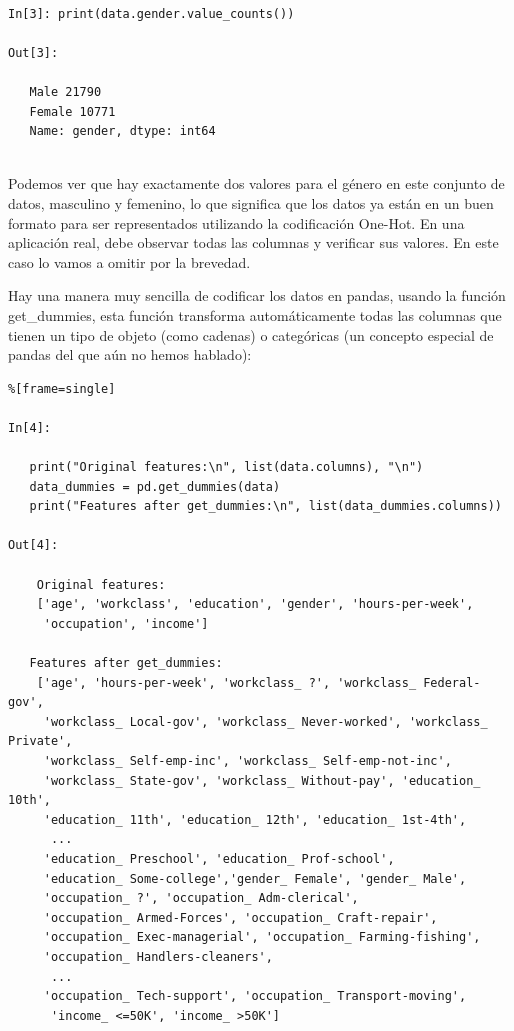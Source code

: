 \begin{lstlisting}  

In[3]: print(data.gender.value_counts())

Out[3]:

   Male 21790
   Female 10771
   Name: gender, dtype: int64
  
\end{lstlisting} 

Podemos ver que hay exactamente dos valores para el género en este conjunto de datos, masculino y femenino, lo que significa que los datos ya están en un buen formato para ser representados utilizando la codificación One-Hot.  En una aplicación real, debe observar todas las columnas y verificar sus valores. En este caso lo vamos a omitir  por la brevedad.

 Hay una manera muy sencilla de codificar los datos en  {\ttfamily pandas}, usando la función {\ttfamily get\_dummies}, esta función  transforma automáticamente todas las columnas que tienen un tipo de objeto (como cadenas) o  categóricas (un concepto especial de {\ttfamily pandas} del que aún no hemos hablado):\\


\begin{lstlisting}%[frame=single]

In[4]:

   print("Original features:\n", list(data.columns), "\n")
   data_dummies = pd.get_dummies(data)
   print("Features after get_dummies:\n", list(data_dummies.columns))

Out[4]:

    Original features:
    ['age', 'workclass', 'education', 'gender', 'hours-per-week',
     'occupation', 'income']

   Features after get_dummies:
    ['age', 'hours-per-week', 'workclass_ ?', 'workclass_ Federal-gov',
     'workclass_ Local-gov', 'workclass_ Never-worked', 'workclass_ Private',
     'workclass_ Self-emp-inc', 'workclass_ Self-emp-not-inc',
     'workclass_ State-gov', 'workclass_ Without-pay', 'education_ 10th',
     'education_ 11th', 'education_ 12th', 'education_ 1st-4th',
      ...
     'education_ Preschool', 'education_ Prof-school', 
     'education_ Some-college','gender_ Female', 'gender_ Male', 
     'occupation_ ?', 'occupation_ Adm-clerical', 
     'occupation_ Armed-Forces', 'occupation_ Craft-repair',
     'occupation_ Exec-managerial', 'occupation_ Farming-fishing',
     'occupation_ Handlers-cleaners',
      ...
     'occupation_ Tech-support', 'occupation_ Transport-moving',
      'income_ <=50K', 'income_ >50K']

\end{lstlisting}


